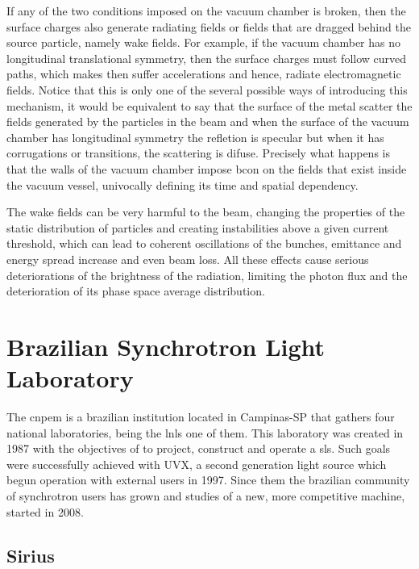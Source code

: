     If any of the two conditions imposed on the vacuum chamber is broken, then the surface charges also generate radiating fields or fields that are dragged behind the source particle, namely wake fields. For example, if the vacuum chamber has no longitudinal translational symmetry, then the surface charges must follow curved paths, which makes then suffer accelerations and hence, radiate electromagnetic fields. Notice that this is only one of the several possible ways of introducing this mechanism, it would be equivalent to say that the surface of the metal scatter the fields generated by the particles in the beam and when the surface of the vacuum chamber has longitudinal symmetry the refletion is specular but when it has corrugations or transitions, the scattering is difuse. Precisely what happens is that the walls of the vacuum chamber impose \gls{bcon} on the fields that exist inside the vacuum vessel, univocally defining its time and spatial dependency.

    The wake fields can be very harmful to the beam, changing the properties of the static distribution of particles and creating instabilities above a given current threshold, which can lead to coherent oscillations of the bunches, emittance and energy spread increase and even beam loss. All these effects cause serious deteriorations of the brightness of the radiation, limiting the photon flux and the deterioration of its phase space average distribution.

\section{Brazilian Synchrotron Light Laboratory}

  	The \gls{cnpem} is a brazilian institution located in Campinas-SP that gathers four national laboratories, being the \gls{lnls} one of them. This laboratory was created in 1987 with the objectives of to project, construct and operate a \gls{sls}. Such goals were successfully achieved with UVX, a second generation light source which begun operation with external users in 1997. Since them the brazilian community of synchrotron users has grown and studies of a new, more competitive machine, started in 2008.

\subsection{Sirius}

